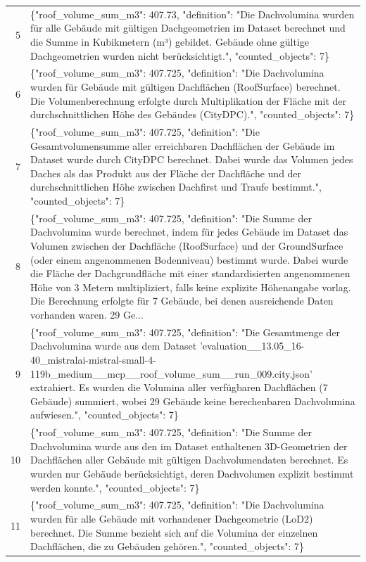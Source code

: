 \documentclass[a4paper,11pt]{article}
\begin{document}
\begin{table}[ht]
\begin{tabular}{r p{12cm}}
5 & \{"roof\_volume\_sum\_m3": 407.73, "definition": "Die Dachvolumina wurden für alle Gebäude mit gültigen Dachgeometrien im Dataset berechnet und die Summe in Kubikmetern (m³) gebildet. Gebäude ohne gültige Dachgeometrien wurden nicht berücksichtigt.", "counted\_objects": 7\} \\
6 & \{"roof\_volume\_sum\_m3": 407.725, "definition": "Die Dachvolumina wurden für Gebäude mit gültigen Dachflächen (RoofSurface) berechnet. Die Volumenberechnung erfolgte durch Multiplikation der Fläche mit der durchschnittlichen Höhe des Gebäudes (CityDPC).", "counted\_objects": 7\} \\
7 & \{"roof\_volume\_sum\_m3": 407.725, "definition": "Die Gesamtvolumensumme aller erreichbaren Dachflächen der Gebäude im Dataset wurde durch CityDPC berechnet. Dabei wurde das Volumen jedes Daches als das Produkt aus der Fläche der Dachfläche und der durchschnittlichen Höhe zwischen Dachfirst und Traufe bestimmt.", "counted\_objects": 7\} \\
8 & \{"roof\_volume\_sum\_m3": 407.725, "definition": "Die Summe der Dachvolumina wurde berechnet, indem für jedes Gebäude im Dataset das Volumen zwischen der Dachfläche (RoofSurface) und der GroundSurface (oder einem angenommenen Bodenniveau) bestimmt wurde. Dabei wurde die Fläche der Dachgrundfläche mit einer standardisierten angenommenen Höhe von 3 Metern multipliziert, falls keine explizite Höhenangabe vorlag. Die Berechnung erfolgte für 7 Gebäude, bei denen ausreichende Daten vorhanden waren. 29 Ge... \\
9 & \{"roof\_volume\_sum\_m3": 407.725, "definition": "Die Gesamtmenge der Dachvolumina wurde aus dem Dataset 'evaluation\_\_13.05\_16-40\_mistralai-mistral-small-4-119b\_medium\_\_mcp\_\_roof\_volume\_sum\_\_run\_009.city.json' extrahiert. Es wurden die Volumina aller verfügbaren Dachflächen (7 Gebäude) summiert, wobei 29 Gebäude keine berechenbaren Dachvolumina aufwiesen.", "counted\_objects": 7\} \\
10 & \{"roof\_volume\_sum\_m3": 407.725, "definition": "Die Summe der Dachvolumina wurde aus den im Dataset enthaltenen 3D-Geometrien der Dachflächen aller Gebäude mit gültigen Dachvolumendaten berechnet. Es wurden nur Gebäude berücksichtigt, deren Dachvolumen explizit bestimmt werden konnte.", "counted\_objects": 7\} \\
11 & \{"roof\_volume\_sum\_m3": 407.725, "definition": "Die Dachvolumina wurden für alle Gebäude mit vorhandener Dachgeometrie (LoD2) berechnet. Die Summe bezieht sich auf die Volumina der einzelnen Dachflächen, die zu Gebäuden gehören.", "counted\_objects": 7\} \\

\end{tabular}
\end{table}
\end{document}

